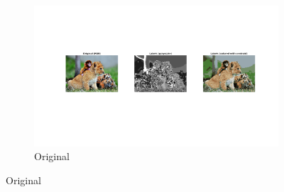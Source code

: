 \begin{figure}[hbt]
	\centering
	\begin{subfigure}[t]{0.3 \textwidth}
		\includegraphics[trim={825px 250px 50px 220px},clip,width=\textwidth]{img/kmeans/animals_k10_no_spatial.png}
		\caption{Original}
		\label{fig:kmeans-geometric-transformations-original}
	\end{subfigure}
	

\end{figure}
